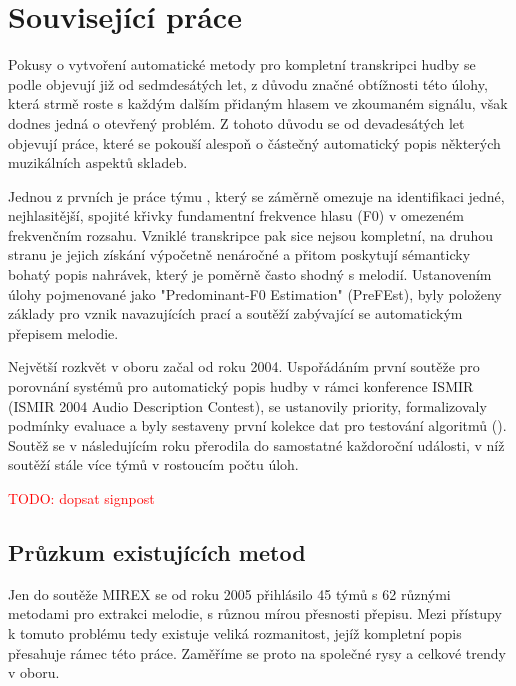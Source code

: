 \chapter{Související práce}\label{cha:souvisejici}

Pokusy o vytvoření automatické metody pro kompletní transkripci hudby se podle \cite{Poliner2007} objevují již od sedmdesátých let, z důvodu značné obtížnosti této úlohy, která strmě roste s každým dalším přidaným hlasem ve zkoumaném signálu, však dodnes jedná o otevřený problém. Z tohoto důvodu se od devadesátých let objevují práce, které se pokouší alespoň o částečný automatický popis některých muzikálních aspektů skladeb.

Jednou z prvních je práce týmu \cite{Goto1999}, který se záměrně omezuje na identifikaci jedné, nejhlasitější, spojité křivky fundamentní frekvence hlasu (F0) v omezeném frekvenčním rozsahu. Vzniklé transkripce pak sice nejsou kompletní, na druhou stranu je jejich získání výpočetně nenáročné a přitom poskytují sémanticky bohatý popis nahrávek, který je poměrně často shodný s melodií. Ustanovením úlohy pojmenované jako "Predominant-F0 Estimation" (PreFEst), byly položeny základy pro vznik navazujících prací a soutěží zabývající se automatickým přepisem melodie.

Největší rozkvět v oboru začal od roku 2004. Uspořádáním první soutěže pro porovnání systémů pro automatický popis hudby v rámci konference ISMIR (ISMIR 2004 Audio Description Contest), se ustanovily priority, formalizovaly podmínky evaluace a byly sestaveny první kolekce dat pro testování algoritmů (\cite{Downie2010}). Soutěž se v následujícím roku přerodila do samostatné každoroční události, v níž soutěží stále více týmů v rostoucím počtu úloh. 

\textcolor{red}{TODO: dopsat signpost}


\section{Průzkum existujících metod}

Jen do soutěže MIREX se od roku 2005 přihlásilo 45 týmů s 62 různými metodami pro extrakci melodie, s různou mírou přesnosti přepisu. Mezi přístupy k tomuto problému tedy existuje veliká rozmanitost, jejíž kompletní popis přesahuje rámec této práce. Zaměříme se proto na společné rysy a celkové trendy v oboru. 

